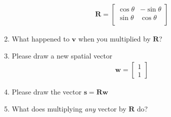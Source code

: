 \begin{prob}
\begin{enumerate}
\begin{align}
\mathbf{R} =
\begin{bmatrix}
\cos \theta & -\sin \theta \\
\sin \theta & \cos \theta \\
\end{bmatrix}
\end{align}
\item What happened to $\mathbf{v}$ when you multiplied by $\mathbf{R}$?
 \item Please draw a new spatial vector
    \begin{align}
    \mathbf{w} = \begin{bmatrix} 1 \\ 1 \end{bmatrix}
    \end{align}
    \item Please draw the vector $\mathbf{s} = \mathbf{Rw}$


\item What does multiplying \emph{any} vector by $\mathbf{R}$ do?

    \end{enumerate}
\end{prob}

